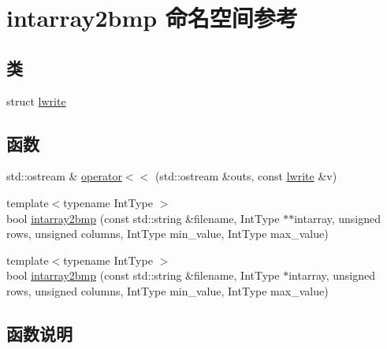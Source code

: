 \hypertarget{namespaceintarray2bmp}{}\section{intarray2bmp 命名空间参考}
\label{namespaceintarray2bmp}
\subsection*{类}
\begin{DoxyCompactItemize}
\item 
struct \hyperlink{structintarray2bmp_1_1lwrite}{lwrite}
\end{DoxyCompactItemize}
\subsection*{函数}
\begin{DoxyCompactItemize}
\item 
std\+::ostream \& \hyperlink{namespaceintarray2bmp_a427bc6d7c8a53613eff03c28fce442ba}{operator$<$$<$} (std\+::ostream \&outs, const \hyperlink{structintarray2bmp_1_1lwrite}{lwrite} \&v)
\item 
{\footnotesize template$<$typename Int\+Type $>$ }\\bool \hyperlink{namespaceintarray2bmp_a504dc3b703d9a772b4d6bf1017234f49}{intarray2bmp} (const std\+::string \&filename, Int\+Type $\ast$$\ast$intarray, unsigned rows, unsigned columns, Int\+Type min\+\_\+value, Int\+Type max\+\_\+value)
\item 
{\footnotesize template$<$typename Int\+Type $>$ }\\bool \hyperlink{namespaceintarray2bmp_af95c6110f71199e05a9997b17957da22}{intarray2bmp} (const std\+::string \&filename, Int\+Type $\ast$intarray, unsigned rows, unsigned columns, Int\+Type min\+\_\+value, Int\+Type max\+\_\+value)
\end{DoxyCompactItemize}


\subsection{函数说明}
